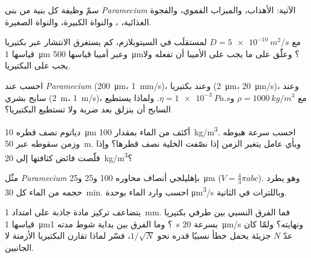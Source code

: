 \begin{exercise}[$\star$]\label{exo:b2:unicellular-diversity:4}
سمّ وظيفة كل بنية من بنى \emph{Paramecium} الآتية: الأهداب،
والميزاب الفموي، والفجوة الغذائية، ، والنواة
الكبيرة، والنواة الصغيرة.
\end{exercise}

\begin{exercise}[$\star\star$]\label{exo:b2:unicellular-diversity:5}
مع $D = \qty{5e-10}{m^2/s}$ لمستقلَب في السيتوبلازم، كم يستغرق
الانتشار عبر بكتيريا قياسها \qty{1}{\micro m} وعبر أميبا قياسها
\qty{500}{\micro m}؟ وعلّق على ما يجب على الأميبا أن تفعله ولا يجب
على البكتيريا.
\end{exercise}

\begin{exercise}[$\star\star$]\label{exo:b2:unicellular-diversity:6}
احسب  عند \emph{Paramecium} (\qty{200}{\micro m}،
\qty{1}{mm/s})، وعند بكتيريا (\qty{2}{\micro m}،
\qty{20}{\micro m/s})، وعند سابح بشري (\qty{2}{m}، \qty{1}{m/s})،
مع $\rho = \qty{1000}{kg/m^3}$ و$\eta = \qty{1e-3}{Pa.s}$. ولماذا
يستطيع السابح أن ينزلق بعد ضربة ولا تستطيع البكتيريا؟
\end{exercise}

\begin{exercise}[$\star\star$]\label{exo:b2:unicellular-diversity:7}
دياتوم نصف قطره \qty{10}{\micro m} أكثف من الماء بمقدار
\qty{100}{kg/m^3}. احسب سرعة هبوطه وزمن سقوطه عبر \qty{50}{m}.
وبأي عامل يتغير الزمن إذا نصّفت الخلية نصف قطرها؟ وإذا قلّصت فائض
كثافتها إلى \qty{20}{kg/m^3}؟
\end{exercise}

\begin{exercise}[$\star\star$]\label{exo:b2:unicellular-diversity:8}
مثّل \emph{Paramecium} بإهليلجي أنصاف محاوره \num{100} و\num{25}
و\qty{25}{\micro m} ($V = \tfrac{4}{3}\pi abc$). وهو يطرد حجمه من
الماء كل \qty{30}{min}. احسب وارد الماء
بوحدة \unit{\micro m^3/s} وباللترات في الثانية.
\end{exercise}

\begin{exercise}[$\star\star$]\label{exo:b2:unicellular-diversity:9}
يتضاعف تركيز مادة جاذبة على امتداد \qty{1}{mm}. فما الفرق النسبي
بين طرفي بكتيريا قياسها \qty{1}{\micro m}؟ وما الفرق بين بداية شوط
مدته \qty{1}{s} بسرعة \qty{20}{\micro m/s} ونهايته؟ ولمّا كان عدّ
$N$ جزيئة يحمل خطأ نسبيًا قدره نحو $1/\sqrt{N}$، فسّر لماذا تقارن
البكتيريا الأزمنة لا الجانبين.
\end{exercise}

